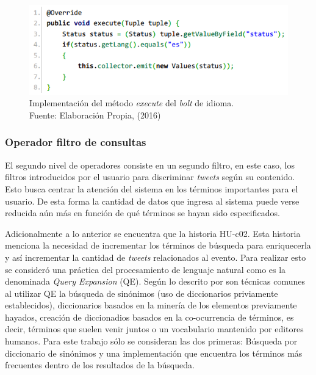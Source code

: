 \begin{figure}[H]
	\centering
	\captionsetup{justification=centering}
	\includegraphics[scale=0.8]{images/LanguageBoltExecute.png}
	\caption[Implementación del método \textit{execute} del \textit{bolt} de idioma.]{Implementación del método \textit{execute} del \textit{bolt} de idioma.\\Fuente: Elaboración Propia, (2016)}
	\label{fig:operadorIdioma}
\end{figure}

\subsubsection*{Operador filtro de consultas}
\label{subsubsec:2op}

El segundo nivel de operadores consiste en un segundo filtro, en este caso, los filtros introducidos por el usuario para discriminar \textit{tweets} según su contenido. Esto busca centrar la atención del sistema en los términos importantes para el usuario. De esta forma la cantidad de datos que ingresa al sistema puede verse reducida aún más en función de qué términos se hayan sido especificados.

Adicionalmente a lo anterior se encuentra que la historia HU-c02. Esta historia menciona la necesidad de incrementar los términos de búsqueda para enriquecerla y así incrementar la cantidad de \textit{tweets} relacionados al evento. Para realizar esto se consideró una práctica del procesamiento de lenguaje natural como es la denominada \textit{Query Expansion} (QE). Según lo descrito por \cite{IRQE} son técnicas comunes al utilizar QE la búsqueda de sinónimos (uso de diccionarios priviamente establecidos), diccionarios basados en la minería de los elementos previamente hayados, creación de diccionadios basados en la co-ocurrencia de términos, es decir, términos que suelen venir juntos o un vocabulario mantenido por editores humanos. Para este trabajo sólo se consideran las dos primeras: Búsqueda por diccionario de sinónimos y una implementación que encuentra los términos más frecuentes dentro de los resultados de la búsqueda.


